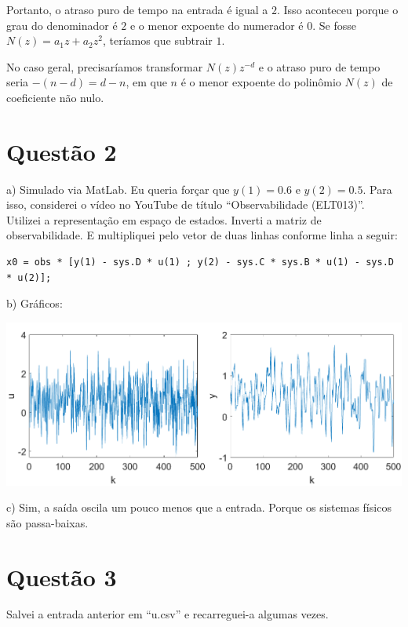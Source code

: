 \documentclass{rbfin}
\begin{document}
Portanto, o atraso puro de tempo na entrada é igual a $2$. Isso aconteceu porque o grau do denominador é $2$ e o menor expoente do numerador é $0$. Se fosse $N(z) = a_1 z + a_2 z^2$, teríamos que subtrair $1$.

No caso geral, precisaríamos transformar $N(z) z^{-d}$ e o atraso puro de tempo seria $-(n - d) = d - n$, em que $n$ é o menor expoente do polinômio $N(z)$ de coeficiente não nulo.

\section*{Questão 2}

a) Simulado via MatLab. Eu queria forçar que $y(1) = 0.6$ e $y(2) = 0.5$. Para isso, considerei o vídeo no YouTube de título ``Observabilidade (ELT013)''. Utilizei a representação em espaço de estados. Inverti a matriz de observabilidade. E multipliquei pelo vetor de duas linhas conforme linha a seguir:

\footnotesize

\begin{verbatim}
x0 = obs * [y(1) - sys.D * u(1) ; y(2) - sys.C * sys.B * u(1) - sys.D * u(2)];
\end{verbatim}

\normalsize

b) Gráficos:

\begin{center}
\includegraphics[scale=0.65]{q2}
\end{center}

c) Sim, a saída oscila um pouco menos que a entrada. Porque os sistemas físicos são passa-baixas.

\section*{Questão 3}

Salvei a entrada anterior em ``u.csv'' e recarreguei-a algumas vezes.
\end{document}
